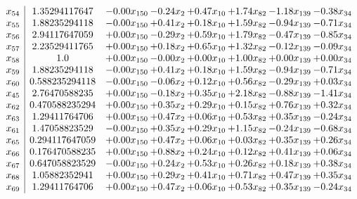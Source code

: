 \documentclass[8pt]{article}
\begin{document}
\[\begin{array}{c| c c@{\hskip 2pt} c@{\hskip 2pt} c@{\hskip 2pt} c@{\hskip 2pt} c@{\hskip 2pt} c@{\hskip 2pt} }
 x_{54}   &  1.35294117647 & -0.00 x_{150} & -0.24 x_{2} & +  0.47 x_{10} & +  1.74 x_{82} & -1.18 x_{139} & -0.38 x_{34}\\
 x_{55}   &  1.88235294118 & -0.00 x_{150} & +  0.41 x_{2} & +  0.18 x_{10} & +  1.59 x_{82} & -0.94 x_{139} & -0.71 x_{34}\\
 x_{56}   &  2.94117647059 & +  0.00 x_{150} & -0.29 x_{2} & +  0.59 x_{10} & +  1.79 x_{82} & -0.47 x_{139} & -0.85 x_{34}\\
 x_{57}   &  2.23529411765 & +  0.00 x_{150} & +  0.18 x_{2} & +  0.65 x_{10} & +  1.32 x_{82} & -0.12 x_{139} & -0.09 x_{34}\\
 x_{58}   &  1.0 & +  0.00 x_{150} & -0.00 x_{2} & +  0.00 x_{10} & +  1.00 x_{82} & +  0.00 x_{139} & +  0.00 x_{34}\\
 x_{59}   &  1.88235294118 & -0.00 x_{150} & +  0.41 x_{2} & +  0.18 x_{10} & +  1.59 x_{82} & -0.94 x_{139} & -0.71 x_{34}\\
 x_{60}   &  0.588235294118 & -0.00 x_{150} & -0.06 x_{2} & +  0.12 x_{10} & +  0.56 x_{82} & -0.29 x_{139} & +  0.03 x_{34}\\
 x_{45}   &  2.76470588235 & +  0.00 x_{150} & -0.18 x_{2} & +  0.35 x_{10} & +  2.18 x_{82} & -0.88 x_{139} & -1.41 x_{34}\\
 x_{62}   &  0.470588235294 & +  0.00 x_{150} & +  0.35 x_{2} & +  0.29 x_{10} & +  0.15 x_{82} & +  0.76 x_{139} & +  0.32 x_{34}\\
 x_{63}   &  1.29411764706 & +  0.00 x_{150} & +  0.47 x_{2} & +  0.06 x_{10} & +  0.53 x_{82} & +  0.35 x_{139} & -0.24 x_{34}\\
 x_{61}   &  1.47058823529 & -0.00 x_{150} & +  0.35 x_{2} & +  0.29 x_{10} & +  1.15 x_{82} & -0.24 x_{139} & -0.68 x_{34}\\
 x_{65}   &  0.294117647059 & +  0.00 x_{150} & +  0.47 x_{2} & +  0.06 x_{10} & +  0.03 x_{82} & +  0.35 x_{139} & +  0.26 x_{34}\\
 x_{66}   &  0.176470588235 & +  0.00 x_{150} & +  0.88 x_{2} & +  0.24 x_{10} & +  0.12 x_{82} & +  0.41 x_{139} & +  0.06 x_{34}\\
 x_{67}   &  0.647058823529 & -0.00 x_{150} & +  0.24 x_{2} & +  0.53 x_{10} & +  0.26 x_{82} & +  0.18 x_{139} & +  0.38 x_{34}\\
 x_{68}   &  1.05882352941 & +  0.00 x_{150} & +  0.29 x_{2} & +  0.41 x_{10} & +  0.71 x_{82} & +  0.47 x_{139} & +  0.35 x_{34}\\
 x_{69}   &  1.29411764706 & +  0.00 x_{150} & +  0.47 x_{2} & +  0.06 x_{10} & +  0.53 x_{82} & +  0.35 x_{139} & -0.24 x_{34}\\

\end{array}\]
\end{document}
